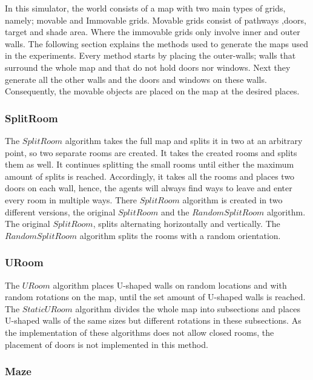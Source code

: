 
In this simulator, the world consists of a map with two main types of grids, namely; movable and Immovable grids. Movable grids consist of pathways ,doors, target and shade area. Where the immovable grids only involve inner and outer walls. The following section explains the methods used to generate the maps used in the experiments.
Every method starts by placing the outer-walls; walls that surround the whole map and that do not hold doors nor windows. Next they generate all the other walls and the doors and windows on these walls. Consequently, the movable objects are placed on the map at the desired places.

\subsubsection{SplitRoom}
The $SplitRoom$ algorithm takes the full map and splits it in two at an arbitrary point, so two separate rooms are created. It takes the created rooms and splits them as well. It continues splitting the small rooms until either the maximum amount of splits is reached. Accordingly, it takes all the rooms and places two doors on each wall, hence, the agents will always find ways to leave and enter every room in multiple ways.
There $SplitRoom$ algorithm is created in two different versions, the original $SplitRoom$ and the $RandomSplitRoom$ algorithm. The original $SplitRoom$, splits alternating horizontally and vertically. The $RandomSplitRoom$ algorithm splits the rooms with a random orientation.

\subsubsection{URoom}
The $URoom$ algorithm places U-shaped walls on random locations and with random rotations on the map, until the set amount of U-shaped walls is reached.
The $StaticURoom$ algorithm divides the whole map into subsections and places U-shaped walls of the same sizes but different rotations in these subsections.
As the implementation of these algorithms does not allow closed rooms, the placement of doors is not implemented in this method.

\subsubsection{Maze}
